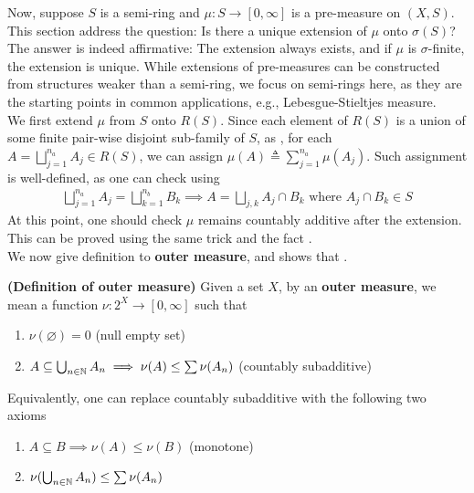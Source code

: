 \documentclass{report}
\begin{document}
\begin{mdframed}
Now, suppose $S$ is a semi-ring and $\mu:S\rightarrow [0,\infty]$ is a pre-measure on $(X,S)$. This section address the question: Is there a unique extension of $\mu$ onto $\sigma (S)$? The answer is indeed affirmative: The extension always exists, and if $\mu$ is $\sigma$-finite, the extension is unique. 
While extensions of pre-measures can be constructed from structures weaker than a semi-ring, we focus on semi-rings here, as they are the starting points in common applications, e.g., Lebesgue-Stieltjes measure.\\

We first extend $\mu$ from $S$ onto $R(S)$. Since each element of $R(S)$ is a union of some finite pair-wise disjoint sub-family of $S$, as , for each $A=\bigsqcup_{j=1}^{n_a}A_j \in R(S)$, we can assign $\mu(A)\triangleq \sum_{j=1}^{n_a}\mu (A_j)$. Such assignment is well-defined, as one can check using  
\begin{align*}
\bigsqcup_{j=1}^{n_a}A_j = \bigsqcup _{k=1}^{n_b}B_k \implies A=\bigsqcup_{j,k} A_j \cap B_k \text{ where }A_j\cap B_k \in S 
\end{align*}
At this point, one should check $\mu$ remains countably additive after the extension. This can be proved using the same trick and the fact .\\

We now give definition to \textbf{outer measure}, and shows that .
\end{mdframed}
\begin{definition}
\textbf{(Definition of outer measure)} Given a set $X$, by an  \textbf{outer measure}, we mean a function $\nu :2^X\rightarrow [0,\infty]$ such that 
\begin{enumerate}[label=(\alph*)]
  \item $ \nu  (\varnothing)=0$ (null empty set)
  \item $A\subseteq \bigcup_{n\in\mathbb{N}} A_n\implies \nu  (A)\leq  \sum \nu (A_n)$ (countably subadditive)
\end{enumerate}
\end{definition}
\begin{mdframed}
Equivalently, one can replace countably subadditive with the following two axioms   
\begin{enumerate}[label=(\alph*)]
  \item $A \subseteq B \implies \nu (A) \leq \nu  (B)$  (monotone)
  \item $\nu  (\bigcup_{n\in\mathbb{N}} A_n )\leq \sum \nu (A_n)$  
\end{enumerate}

\end{mdframed}
\end{document}
